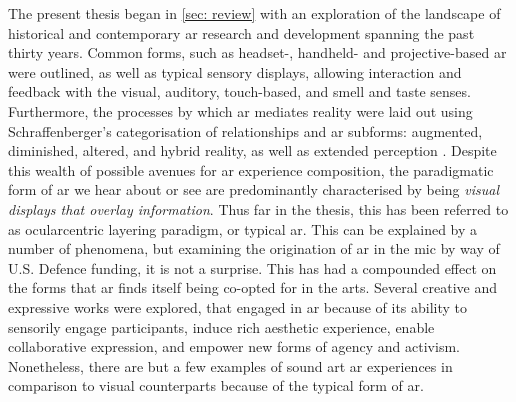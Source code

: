 \begin{itemize}
    \RQgenealogy
    \RQtheory
\end{itemize}

The present thesis began in \autoref{sec: review} with an exploration of the landscape of historical and contemporary \gls{ar} research and development spanning the past thirty years. Common forms, such as headset-, handheld- and projective-based \gls{ar} were outlined, as well as typical sensory displays, allowing interaction and feedback with the visual, auditory, touch-based, and smell and taste senses. Furthermore, the processes by which \gls{ar} mediates reality were laid out using Schraffenberger's categorisation of relationships and \gls{ar} subforms: augmented, diminished, altered, and hybrid reality, as well as extended perception \citep{schraffenberger2018}. Despite this wealth of possible avenues for \gls{ar} experience composition, the paradigmatic form of \gls{ar} we hear about or see are predominantly characterised by being \textit{visual displays that overlay information}. Thus far in the thesis, this has been referred to as ocularcentric layering paradigm, or typical \gls{ar}. This can be explained by a number of phenomena, but examining the origination of \gls{ar} in the \gls{mic} by way of U.S. Defence funding, it is not a surprise. This has had a compounded effect on the forms that \gls{ar} finds itself being co-opted for in the arts. Several creative and expressive works were explored, that engaged in \gls{ar} because of its ability to sensorily engage participants, induce rich aesthetic experience, enable collaborative expression, and empower new forms of agency and activism. Nonetheless, there are but a few examples of sound art \gls{ar} experiences in comparison to visual counterparts because of the typical form of \gls{ar}.

